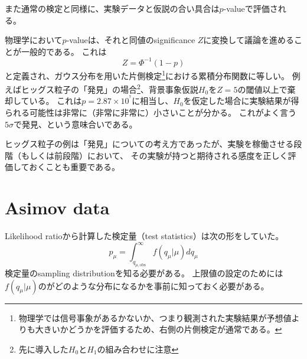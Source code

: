 また通常の検定と同様に、実験データと仮説の合い具合は$p$-valueで評価される。

物理学において$p$-valueは、それと同値のsignificance $Z$に変換して議論を進めることが一般的である。
これは
\begin{equation}
    Z = \Phi^{-1}(1-p)
\end{equation}
と定義され、ガウス分布を用いた片側検定\footnote{物理学では信号事象があるかないか、つまり観測された実験結果が予想値よりも大きいかどうかを評価するため、右側の片側検定が通常である。}における累積分布関数に等しい。
例えばヒッグス粒子の「発見」の場合\footnote{先に導入した$H_0$と$H_1$の組み合わせに注意}、背景事象仮説$H_0$を$Z=5$の閾値以上で棄却している。
これは$p=2.87\times10^{^7}$に相当し、$H_0$を仮定した場合に実験結果が得られる可能性は非常に（非常に非常に）小さいことが分かる。
これがよく言う$5\sigma$で発見、という意味合いである。

ヒッグス粒子の例は「発見」についての考え方であったが、実験を稼働させる段階（もしくは前段階）において、
その実験が持つと期待される感度を正しく評価しておくことも重要である。




\chapter{Asimov data}

Likelihood ratioから計算した検定量（test statistics）は次の形をしていた。
\begin{equation}
  p_\mu = \int_{q_{\mu,\mathrm{obs}}}^\infty f(q_\mu|\mu)dq_\mu
\end{equation}
検定量のsampling distributionを知る必要がある。
上限値の設定のためには$f(q_\mu|\mu)$のがどのような分布になるかを事前に知っておく必要がある。
